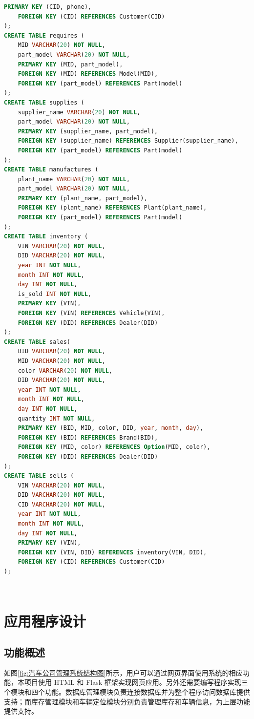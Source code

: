 \documentclass[hyperref,a4paper,UTF8]{ctexart}
\begin{document}
\begin{lstlisting}[language=SQL]
    PRIMARY KEY (CID, phone),
    FOREIGN KEY (CID) REFERENCES Customer(CID)
);
CREATE TABLE requires (
    MID VARCHAR(20) NOT NULL,
    part_model VARCHAR(20) NOT NULL,
    PRIMARY KEY (MID, part_model),
    FOREIGN KEY (MID) REFERENCES Model(MID),
    FOREIGN KEY (part_model) REFERENCES Part(model)
);
CREATE TABLE supplies (
    supplier_name VARCHAR(20) NOT NULL,
    part_model VARCHAR(20) NOT NULL,
    PRIMARY KEY (supplier_name, part_model),
    FOREIGN KEY (supplier_name) REFERENCES Supplier(supplier_name),
    FOREIGN KEY (part_model) REFERENCES Part(model)
);
CREATE TABLE manufactures (
    plant_name VARCHAR(20) NOT NULL,
    part_model VARCHAR(20) NOT NULL,
    PRIMARY KEY (plant_name, part_model),
    FOREIGN KEY (plant_name) REFERENCES Plant(plant_name),
    FOREIGN KEY (part_model) REFERENCES Part(model)
);
CREATE TABLE inventory (
    VIN VARCHAR(20) NOT NULL,
    DID VARCHAR(20) NOT NULL,
    year INT NOT NULL,
    month INT NOT NULL,
    day INT NOT NULL,
    is_sold INT NOT NULL,
    PRIMARY KEY (VIN),
    FOREIGN KEY (VIN) REFERENCES Vehicle(VIN),
    FOREIGN KEY (DID) REFERENCES Dealer(DID)
);
CREATE TABLE sales(
    BID VARCHAR(20) NOT NULL,
    MID VARCHAR(20) NOT NULL,
    color VARCHAR(20) NOT NULL,
    DID VARCHAR(20) NOT NULL,
    year INT NOT NULL,
    month INT NOT NULL,
    day INT NOT NULL,
    quantity INT NOT NULL,
    PRIMARY KEY (BID, MID, color, DID, year, month, day),
    FOREIGN KEY (BID) REFERENCES Brand(BID),
    FOREIGN KEY (MID, color) REFERENCES Option(MID, color),
    FOREIGN KEY (DID) REFERENCES Dealer(DID)
);
CREATE TABLE sells (
    VIN VARCHAR(20) NOT NULL,
    DID VARCHAR(20) NOT NULL,
    CID VARCHAR(20) NOT NULL,
    year INT NOT NULL,
    month INT NOT NULL,
    day INT NOT NULL,
    PRIMARY KEY (VIN),
    FOREIGN KEY (VIN, DID) REFERENCES inventory(VIN, DID),
    FOREIGN KEY (CID) REFERENCES Customer(CID)
);
\end{lstlisting}

\

\section{应用程序设计\label{sec:应用程序设计}}

\subsection{功能概述}

如图\ref{fig:汽车公司管理系统结构图}所示，用户可以通过网页界面使用系统的相应功能，本项目使用 HTML 和 Flask 框架实现网页应用。另外还需要编写程序实现三个模块和四个功能。数据库管理模块负责连接数据库并为整个程序访问数据库提供支持；而库存管理模块和车辆定位模块分别负责管理库存和车辆信息，为上层功能提供支持。
\end{document}
